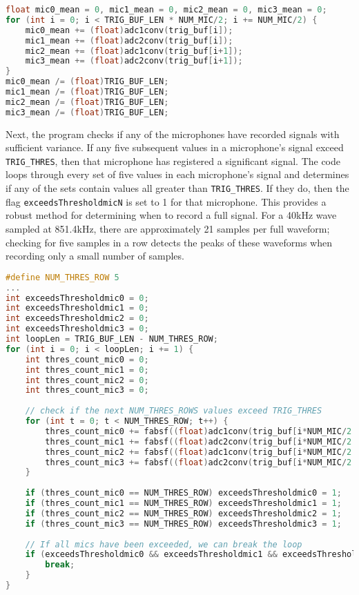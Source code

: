 \documentclass[12pt,a4paper]{report}
\begin{document}
\begin{lstlisting}[language=C++]
float mic0_mean = 0, mic1_mean = 0, mic2_mean = 0, mic3_mean = 0;
for (int i = 0; i < TRIG_BUF_LEN * NUM_MIC/2; i += NUM_MIC/2) {
	mic0_mean += (float)adc1conv(trig_buf[i]);
	mic1_mean += (float)adc2conv(trig_buf[i]);
	mic2_mean += (float)adc1conv(trig_buf[i+1]);
	mic3_mean += (float)adc2conv(trig_buf[i+1]);
}
mic0_mean /= (float)TRIG_BUF_LEN;
mic1_mean /= (float)TRIG_BUF_LEN;
mic2_mean /= (float)TRIG_BUF_LEN;
mic3_mean /= (float)TRIG_BUF_LEN;
\end{lstlisting}

Next, the program checks if any of the microphones have recorded signals with sufficient variance. If any five subsequent values in a microphone’s signal exceed \verb|TRIG_THRES|, then that microphone has registered a significant signal. The code loops through every set of five values in each microphone’s signal and determines if any of the sets contain values all greater than \verb|TRIG_THRES|. If they do, then the flag \verb|exceedsThresholdmicN| is set to 1 for that microphone. This provides a robust method for determining when to record a full signal. For a 40kHz wave sampled at 851.4kHz, there are approximately 21 samples per full waveform; checking for five samples in a row detects the peaks of these waveforms when recording only a small number of samples.

\begin{lstlisting}[language=C++]
#define NUM_THRES_ROW 5
...
int exceedsThresholdmic0 = 0;
int exceedsThresholdmic1 = 0;
int exceedsThresholdmic2 = 0;
int exceedsThresholdmic3 = 0;
int loopLen = TRIG_BUF_LEN - NUM_THRES_ROW;
for (int i = 0; i < loopLen; i += 1) {
	int thres_count_mic0 = 0;
	int thres_count_mic1 = 0;
	int thres_count_mic2 = 0;
	int thres_count_mic3 = 0;
	
	// check if the next NUM_THRES_ROWS values exceed TRIG_THRES
	for (int t = 0; t < NUM_THRES_ROW; t++) {
		thres_count_mic0 += fabsf((float)adc1conv(trig_buf[i*NUM_MIC/2 + t*NUM_MIC/2 + 0]) - mic0_mean) > TRIG_THRES;
		thres_count_mic1 += fabsf((float)adc2conv(trig_buf[i*NUM_MIC/2 + t*NUM_MIC/2 + 0]) - mic1_mean) > TRIG_THRES;
		thres_count_mic2 += fabsf((float)adc1conv(trig_buf[i*NUM_MIC/2 + t*NUM_MIC/2 + 1]) - mic2_mean) > TRIG_THRES;
		thres_count_mic3 += fabsf((float)adc2conv(trig_buf[i*NUM_MIC/2 + t*NUM_MIC/2 + 1]) - mic3_mean) > TRIG_THRES;
	}
	
	if (thres_count_mic0 == NUM_THRES_ROW) exceedsThresholdmic0 = 1;
	if (thres_count_mic1 == NUM_THRES_ROW) exceedsThresholdmic1 = 1;
	if (thres_count_mic2 == NUM_THRES_ROW) exceedsThresholdmic2 = 1;
	if (thres_count_mic3 == NUM_THRES_ROW) exceedsThresholdmic3 = 1;
	
	// If all mics have been exceeded, we can break the loop
	if (exceedsThresholdmic0 && exceedsThresholdmic1 && exceedsThresholdmic2 && exceedsThresholdmic3) {
		break;
	}
}
\end{lstlisting}
\end{document}
